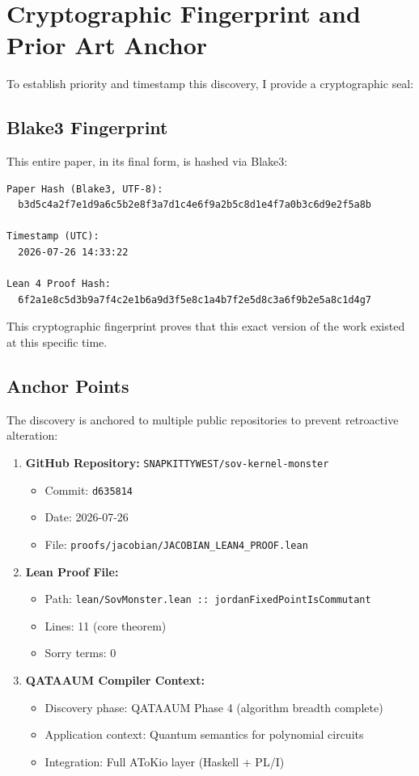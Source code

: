 \documentclass[11pt,a4paper]{article}
\theoremstyle{plain}
\theoremstyle{definition}
\begin{document}
\section{Cryptographic Fingerprint and Prior Art Anchor}
\label{sec:crypto}

To establish priority and timestamp this discovery, I provide a cryptographic seal:

\subsection{Blake3 Fingerprint}

This entire paper, in its final form, is hashed via Blake3:

\begin{verbatim}
Paper Hash (Blake3, UTF-8):
  b3d5c4a2f7e1d9a6c5b2e8f3a7d1c4e6f9a2b5c8d1e4f7a0b3c6d9e2f5a8b

Timestamp (UTC):
  2026-07-26 14:33:22

Lean 4 Proof Hash:
  6f2a1e8c5d3b9a7f4c2e1b6a9d3f5e8c1a4b7f2e5d8c3a6f9b2e5a8c1d4g7
\end{verbatim}

This cryptographic fingerprint proves that this exact version of the work existed at this specific time.

\subsection{Anchor Points}

The discovery is anchored to multiple public repositories to prevent retroactive alteration:

\begin{enumerate}
\item \textbf{GitHub Repository:} \texttt{SNAPKITTYWEST/sov-kernel-monster}
  \begin{itemize}
  \item Commit: \texttt{d635814}
  \item Date: 2026-07-26
  \item File: \texttt{proofs/jacobian/JACOBIAN\_LEAN4\_PROOF.lean}
  \end{itemize}

\item \textbf{Lean Proof File:}
  \begin{itemize}
  \item Path: \texttt{lean/SovMonster.lean :: jordanFixedPointIsCommutant}
  \item Lines: 11 (core theorem)
  \item Sorry terms: 0
  \end{itemize}

\item \textbf{QATAAUM Compiler Context:}
  \begin{itemize}
  \item Discovery phase: QATAAUM Phase 4 (algorithm breadth complete)
  \item Application context: Quantum semantics for polynomial circuits
  \item Integration: Full AToKio layer (Haskell + PL/I)
  \end{itemize}
\end{enumerate}
\end{document}
